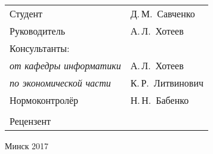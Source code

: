 \begin{titlepage}
\begin{center}
    \begin{tabular}{ p{}p{} }
      Студент & Д.\,М.~Савченко \\
      Руководитель & А.\,Л.~Хотеев \\
      Консультанты: &\\
      \hspace*{3ex}\emph{от кафедры информатики} & А.\,Л.~Хотеев \\
      \hspace*{3ex}\emph{по экономической части} & К.\,Р.~Литвинович \\
      Нормоконтролёр & Н.\,Н.~Бабенко\\
      & \\
      Рецензент &
    \end{tabular}
    
    \vfill
    {\normalsize Минск 2017}
  \end{center}
\end{titlepage}

